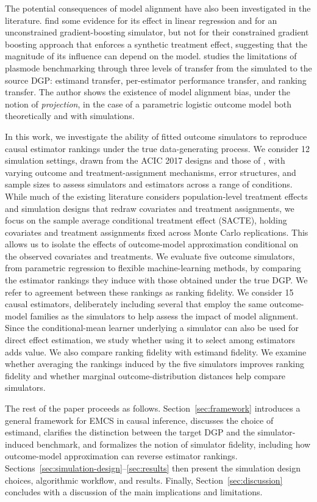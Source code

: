 The potential consequences of model alignment have also been investigated in the literature.  find some evidence for its effect in linear regression and for an unconstrained gradient-boosting simulator, but not for their constrained gradient boosting approach that enforces a synthetic treatment effect, suggesting that the magnitude of its influence can depend on the model.  studies the limitations of plasmode benchmarking through three levels of transfer from the simulated to the source DGP: estimand transfer, per-estimator performance transfer, and ranking transfer. The author shows the existence of model alignment bias, under the notion of \emph{projection}, in the case of a parametric logistic outcome model both theoretically and with simulations.

In this work, we investigate the ability of fitted outcome simulators to reproduce causal estimator rankings under the true data-generating process. We consider 12 simulation settings, drawn from the ACIC 2017 designs \cite{hahnAtlanticCausalInference2019} and those of , with varying outcome and treatment-assignment mechanisms, error structures, and sample sizes to assess simulators and estimators across a range of conditions. While much of the existing literature considers population-level treatment effects and simulation designs that redraw covariates and treatment assignments, we focus on the sample average conditional treatment effect (SACTE), holding covariates and treatment assignments fixed across Monte Carlo replications. This allows us to isolate the effects of outcome-model approximation conditional on the observed covariates and treatments. We evaluate five outcome simulators, from parametric regression to flexible machine-learning methods, by comparing the estimator rankings they induce with those obtained under the true DGP. We refer to agreement between these rankings as ranking fidelity. We consider 15 causal estimators, deliberately including several that employ the same outcome-model families as the simulators to help assess the impact of model alignment. Since the conditional-mean learner underlying a simulator can also be used for direct effect estimation, we study whether using it to select among estimators adds value. We also compare ranking fidelity with estimand fidelity. We examine whether averaging the rankings induced by the five simulators improves ranking fidelity and whether marginal outcome-distribution distances help compare simulators.

The rest of the paper proceeds as follows. Section~\ref{sec:framework} introduces a general framework for EMCS in causal inference, discusses the choice of estimand, clarifies the distinction between the target DGP and the simulator-induced benchmark, and formalizes the notion of simulator fidelity, including how outcome-model approximation can reverse estimator rankings. Sections~\ref{sec:simulation-design}--\ref{sec:results} then present the simulation design choices, algorithmic workflow, and results. Finally, Section~\ref{sec:discussion} concludes with a discussion of the main implications and limitations.
